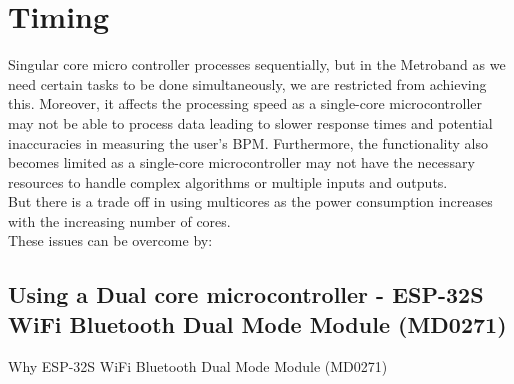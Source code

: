 \documentclass{article}
\begin{document}
        \section{Timing}
        Singular core micro controller processes sequentially, but in the Metroband as we need certain tasks to be done simultaneously, we are restricted from achieving this. Moreover, it affects the processing speed as a single-core microcontroller may not be able to process data leading to slower response times and potential inaccuracies in measuring the user's BPM. Furthermore, the functionality also becomes limited as a single-core microcontroller may not have the necessary resources to handle complex algorithms or multiple inputs and outputs. \\
        
        But there is a trade off in using multicores as the power consumption increases with the increasing number of cores. \\
        
        These issues can be overcome by:
        
        \subsection{Using a Dual core microcontroller - ESP-32S WiFi Bluetooth Dual Mode Module (MD0271)}

        \begin{figure}[htpb]
                \centering
            \end{figure}

        Why ESP-32S WiFi Bluetooth Dual Mode Module (MD0271)
\end{document}
